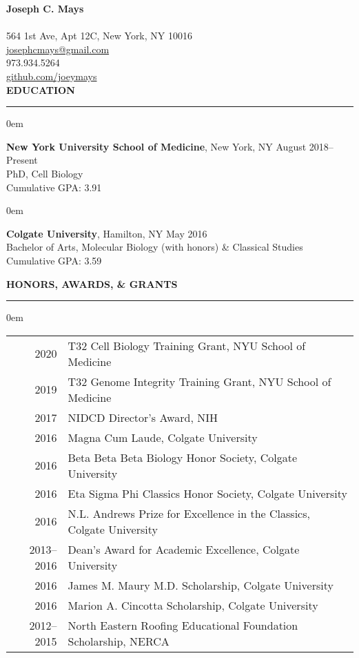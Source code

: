 \documentclass[11pt, letterpaper]{article}
\newenvironment{CVSection}{
\begin{addmargin}[2em]{0em}
\begin{samepage}}
{\end{samepage}
\end{addmargin}\bigskip}
\newcommand{\CVHeading}[1]{
\MakeUppercase{\bf #1}
\smallskip
\hrule
\medskip
}
\begin{document}
{\Huge\textbf{Joseph C. Mays}}\\\\
\faHome\hspace{2 mm}564 1st Ave, Apt 12C, New York, NY 10016\\
\faEnvelopeSquare\hspace{2.3 mm}\href{mailto:josephcmays+CV@gmail.com}{josephcmays@gmail.com}\\
\faPhone\hspace{2.4 mm}973.934.5264\\
\faGithub\hspace{2 mm}\href{https://github.com/joeymays}{github.com/joeymays}\\

\CVHeading{Education}
\begin{CVSection}
\textbf{New York University School of Medicine}, New York, NY \hfill August 2018--Present\\
PhD, Cell Biology\\
Cumulative GPA: 3.91
\end{CVSection}

\begin{CVSection}
\textbf{Colgate University}, Hamilton, NY \hfill May 2016\\
Bachelor of Arts, Molecular Biology (with honors) \& Classical Studies\\ 
Cumulative GPA: 3.59
\end{CVSection}

\CVHeading{Honors, Awards, \& Grants}
\begin{CVSection}
\begin{tabular}{r|l}
2020 & T32 Cell Biology Training Grant, NYU School of Medicine\\
2019 & T32 Genome Integrity Training Grant, NYU School of Medicine\\
2017 & NIDCD Director’s Award, NIH\\
2016 & Magna Cum Laude, Colgate University\\
2016 & Beta Beta Beta Biology Honor Society, Colgate University\\
2016 & Eta Sigma Phi Classics Honor Society, Colgate University\\
2016 & N.L. Andrews Prize for Excellence in the Classics, Colgate University\\
2013--2016 & Dean’s Award for Academic Excellence, Colgate University\\
2016 & James M. Maury M.D. Scholarship, Colgate University\\
2016 & Marion A. Cincotta Scholarship, Colgate University\\
2012--2015 & North Eastern Roofing Educational Foundation Scholarship, NERCA\\
\end{tabular}
\end{CVSection}
\end{document}
